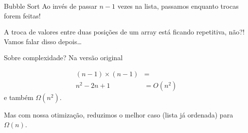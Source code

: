 \documentclass{beamer}
\begin{document}
\begin{frame}{Bubble Sort}
  Ao invés de passar $n - 1$ vezes na lista, passamos enquanto
  trocas forem feitas!

  A troca de valores entre duas posições de um array está ficando
  repetitiva, não?! Vamos falar disso depois\ldots

  \framebreak

  Sobre complexidade? Na versão original

  \begin{align*}
    (n - 1) \times (n - 1) & = \\
    n^2 - 2n + 1 & = O(n^2) 
  \end{align*}
  e também $\Omega(n^2)$.

  Mas com nossa otimização, reduzimos o melhor caso (lista já
  ordenada) para $\Omega(n)$.

\end{frame}
\end{document}
